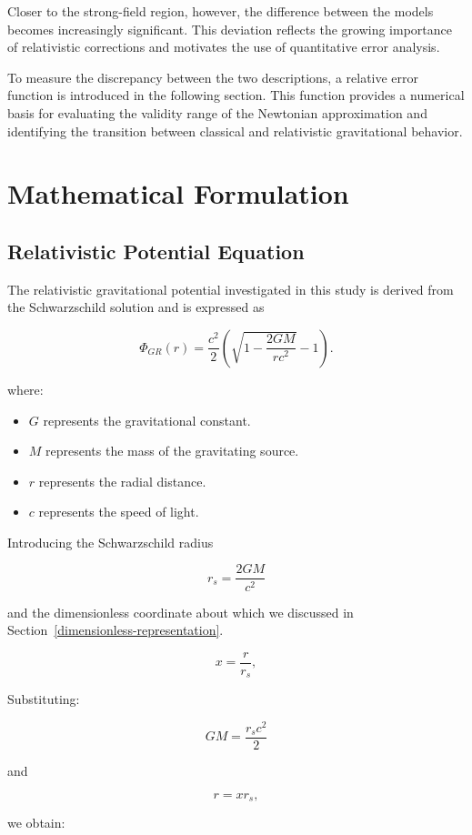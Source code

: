 \documentclass[
]{article}
\begin{document}
Closer to the strong-field region, however, the difference between the
models becomes increasingly significant. This deviation reflects the
growing importance of relativistic corrections and motivates the use of
quantitative error analysis.

To measure the discrepancy between the two descriptions, a relative
error function is introduced in the following section. This function
provides a numerical basis for evaluating the validity range of the
Newtonian approximation and identifying the transition between classical
and relativistic gravitational behavior.

\section{Mathematical Formulation}\label{mathematical-formulation}

\subsection{Relativistic Potential Equation}\label{relativistic-potential-equation}

The relativistic gravitational potential investigated in this study is
derived from the Schwarzschild solution and is expressed as

\[
\Phi_{GR}(r)=
\frac{c^2}{2}
\left(
\sqrt{1-\frac{2GM}{rc^2}}
-1
\right).
\]

where:
\begin{itemize}
\item $G$ represents the gravitational constant.
\item $M$ represents the mass of the gravitating source.
\item $r$ represents the radial distance.
\item $c$ represents the speed of light.
\end{itemize}

Introducing the Schwarzschild radius

\[
r_s=\frac{2GM}{c^2}
\]

and the dimensionless coordinate about which we discussed in Section~\ref{dimensionless-representation}.

\[
x=\frac{r}{r_s},
\]

Substituting:

\[
GM=\frac{r_sc^2}{2}
\]

and

\[
r=xr_s,
\]

we obtain:
\end{document}
